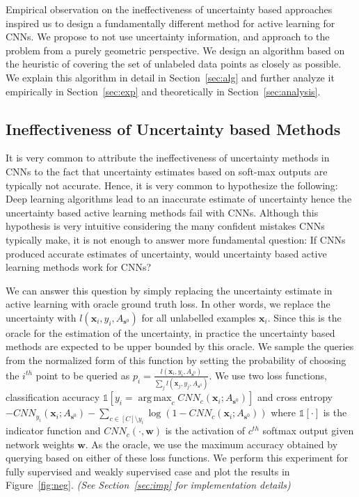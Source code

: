\documentclass{article}
\DeclareMathOperator*{\argmax}{arg\,max}
\begin{document}
Empirical observation on the ineffectiveness of uncertainty based approaches inspired us to design a fundamentally different method for active learning for CNNs. We propose to not use uncertainty information, and approach to the problem from a purely geometric perspective. We design an algorithm based on the heuristic of covering the set of unlabeled data points as closely as possible. We explain this algorithm in detail in Section~\ref{sec:alg} and further analyze it empirically in Section~\ref{sec:exp} and theoretically in Section~\ref{sec:analysis}.

\subsection{Ineffectiveness of Uncertainty based Methods}
\label{sec:whatif}
It is very common to attribute the ineffectiveness of uncertainty methods in CNNs to the fact that uncertainty estimates based on soft-max outputs are typically not accurate. Hence, it is very common to hypothesize the following: Deep learning algorithms lead to an inaccurate estimate of uncertainty hence the uncertainty based active learning methods fail with CNNs. Although this hypothesis is very intuitive considering the many confident mistakes CNNs typically make, it is not enough to answer more fundamental question: If CNNs produced accurate estimates of uncertainty, would uncertainty based active learning methods work for CNNs?

We can answer this question by simply replacing the uncertainty estimate in active learning with oracle ground truth loss. In other words, we replace the uncertainty with $l(\mathbf{x}_i,y_i,A_{\mathbf{s}^0})$ for all unlabelled examples $\mathbf{x}_i$. Since this is the oracle for the estimation of the uncertainty, in practice the uncertainty based methods are expected to be upper bounded by this oracle. We sample the queries from the normalized form of this function by setting the probability of choosing the $i^{th}$ point to be queried as $p_i=\frac{l(\mathbf{x}_i,y_i,A_{\mathbf{s}^0})}{\sum_j l(\mathbf{x}_j,y_j,A_{\mathbf{s}^0})}$. We use two loss functions, classification accuracy \mbox{$\mathds{1}[y_i = \argmax_c CNN_c(\mathbf{x}_i;A_{\mathbf{s}^0})]$} and cross entropy \mbox{$ - CNN_{y_i}(\mathbf{x}_i;A_{\mathbf{s}^0}) -\sum_{c \in [C] \setminus y_i} \log(1-  CNN_{c}(\mathbf{x}_i;A_{\mathbf{s}^0}))$} where $\mathds{1}[\cdot]$ is the indicator function and $CNN_c(\cdot,\mathbf{w})$ is the activation of $c^{th}$ softmax output given network weights $\mathbf{w}$. As the oracle, we use the maximum accuracy obtained by querying based on either of these loss functions. We perform this experiment for fully supervised and weakly supervised case and plot the results in Figure~\ref{fig:neg}. \emph{(See Section~\ref{sec:imp} for implementation details)}
\end{document}
